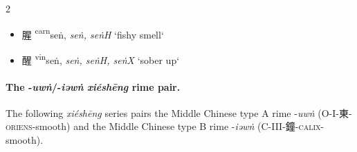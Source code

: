 \begin{multicols}{2}
\begin{minipage}{\columnwidth}
\begin{itemize}[leftmargin=*, labelsep=0.5em]
\begin{itemize}

    \item {\Large{腥}} %
    {\large{{\textsuperscript{carn}}seṅ}},
    \textit{seṅ, seṅH}
    `fishy smell`

    \item {\Large{醒}} %
    {\large{{\textsuperscript{vin}}seṅ}},
    \textit{seṅ, seṅH, seṅX}
    `sober up`

\end{itemize}
\end{itemize}
\end{minipage}
\end{multicols}

\paragraph{The -\textit{uwṅ}/-\textit{iəwṅ} \textit{xiéshēng} rime pair.}
\label{par:uwng-iəwṅ-XS-pair}
The following \textit{xiéshēng} series pairs the Middle Chinese type A rime -\textit{uwṅ} (O-I-東-\textsc{oriens}-smooth) and the Middle Chinese type B rime -\textit{iəwṅ} (C-III-鐘-\textsc{calix}-smooth). 


